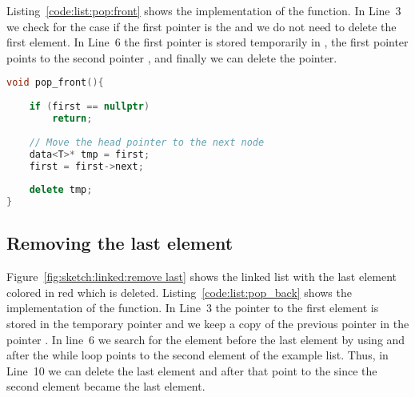\documentclass[11pt,fleqn]{book} %
\begin{document}
Listing~\ref{code:list:pop:front} shows the implementation of the  function. In Line~3 we check for the case if the first pointer is the  and we do not need to delete the first element. In Line~6 the first pointer is stored temporarily in , the first pointer points to the second pointer , and finally we can delete the  pointer.


\begin{lstlisting}[language=c++,caption={Implementation of the \cpp{pop_front} function of a linked list.\label{code:list:pop:front}},float,floatplacement=tb]
void pop_front(){
    
    if (first == nullptr) 
        return; 
  
    // Move the head pointer to the next node 
    data<T>* tmp = first; 
    first = first->next; 
  
    delete tmp;   
}
\end{lstlisting}


\subsection*{Removing the last element}
Figure~\ref{fig:sketch:linked:remove last} shows the linked list with the last element colored in \textcolor{amaranth}{red} which is deleted. Listing~\ref{code:list:pop_back} shows the implementation of the  function. In Line~3 the pointer to the first element is stored in the temporary pointer  and we keep a copy of the previous pointer in the pointer . In line~6 we search for the element before the last element by using  and after the while loop  points to the second element of the example list.  Thus, in Line~10 we can delete the last element  and after that point to the  since the second element became the last element.
\end{document}
